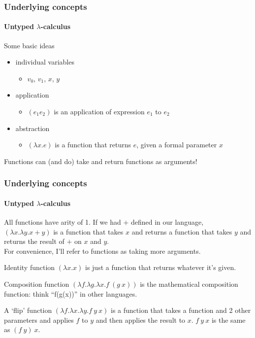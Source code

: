 \documentclass{beamer}
\begin{document}
\begin{frame}
  \frametitle{Underlying concepts}
  \framesubtitle{Untyped $\lambda$-calculus }
  Some basic ideas
  \pause
  \begin{itemize}[<+->]
    \item individual variables
      \begin{itemize}
        \item $v_0$, $v_1$, $x$, $y$
      \end{itemize}
    \item application
      \begin{itemize}
        \item $(e_1e_2)$ is an application of expression $e_1$ to
          $e_2$
      \end{itemize}
    \item abstraction
      \begin{itemize}
        \item $(\lambda x.e)$ is a function that returns $e$, given a
          formal parameter $x$
      \end{itemize}
  \end{itemize}
  \pause
  Functions can (and do) take and return functions as arguments!
\end{frame}
\begin{frame}
  \frametitle{Underlying concepts}
  \framesubtitle{Untyped $\lambda$-calculus}
  All functions have arity of 1. If we had $+$ defined in our language,
  $(\lambda x.\lambda y. x + y)$ is a function that takes $x$ and
  returns a function that takes $y$ and returns the result of $+$ on
  $x$ and $y$.\\
  \pause
  For convenience, I'll refer to functions as taking more arguments.
  \pause
  \begin{exampleblock}{Identity function}
    $(\lambda x.x)$ is just a function that returns whatever it's
    given.
  \end{exampleblock}
  \pause
  \begin{exampleblock}{Composition function}
    $(\lambda f.\lambda g.\lambda x.f\:(g\:x))$ is the mathematical
    composition function: think ``f(g(x))'' in other languages.
  \end{exampleblock}
  \pause
  \begin{exampleblock}{A `flip' function}
    $(\lambda f.\lambda x.\lambda y.f\:y\:x)$ is a function
    that takes a function and 2 other parameters and applies $f$ to
    $y$ and then applies the result to $x$. $f\:y\:x$ is the same as $(f\:y)\:x$.
  \end{exampleblock}
\end{frame}
\end{document}
